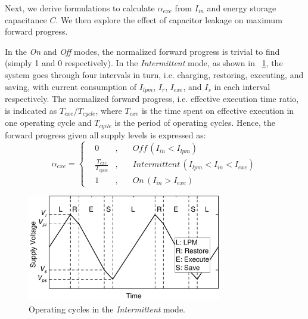 Next, we derive formulations to calculate $\alpha_{exe}$ from $I_{in}$ and energy storage capacitance $C$. We then explore the effect of capacitor leakage on maximum forward progress. 

In the \textit{On} and \textit{Off} modes, the normalized forward progress is trivial to find (simply 1 and 0 respectively). In the \textit{Intermittent} mode,  as shown in \figurename{~\ref{fig:operatingCycle}}, the system goes through four intervals in turn, i.e. charging, restoring, executing, and saving, with current consumption of $I_{lpm}$, $I_{r}$, $I_{exe}$, and $I_{s}$ in each interval respectively. The normalized forward progress, i.e. effective execution time ratio, is indicated as $T_{exe} / T_{cycle}$, where $T_{exe}$ is the time spent on effective execution in one operating cycle and $T_{cycle}$ is the period of operating cycles. Hence, the forward progress given all supply levels is expressed as:
\begin{equation}
    \alpha_{exe} = \left\{
    \begin{aligned}
        & 0 & , & \quad \textit{Off} \, (I_{in} < I_{lpm}) \\
        & \frac{T_{exe}}{T_{cycle}} & , & \quad \textit{Intermittent} \, (I_{lpm} < I_{in} < I_{exe}) \\
        & 1 & , & \quad \textit{On} \, (I_{in} > I_{exe})
    \end{aligned}
    \right.
    \label{eq:feff}
\end{equation}

\begin{figure}[!t]
  \centering
  \includegraphics[width=3.33in]{ch3_sizingeffect/figures/CRESdemoFig}
  \caption{Operating cycles in the \textit{Intermittent} mode. }
  \label{fig:operatingCycle}
\end{figure}

